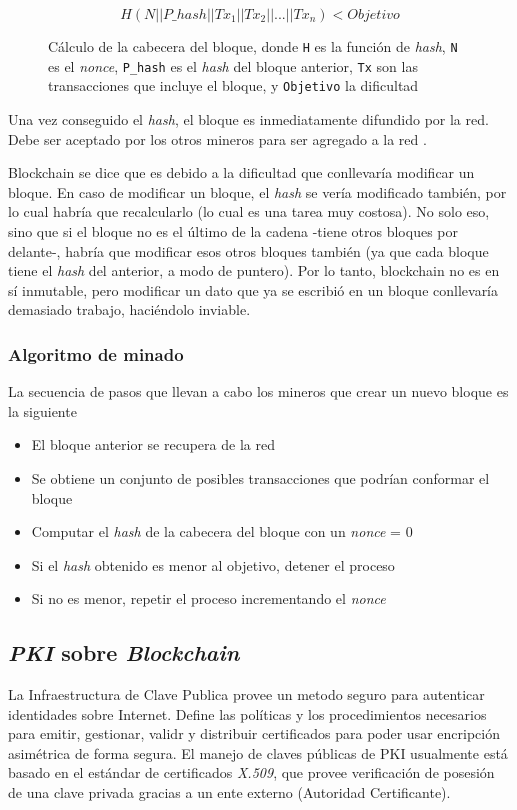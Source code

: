\begin{figure}[H]
    \centering
    \[ H(N || P\_hash|| Tx_1 || Tx_2 || ... || Tx_n) < Objetivo \]
    \caption*{Cálculo de la cabecera del bloque, donde \texttt{H} es la función de \emph{hash}, \texttt{N} es el \emph{nonce}, \texttt{P\_hash} es el \emph{hash} del bloque anterior, \texttt{Tx} son las transacciones que incluye el bloque, y \texttt{Objetivo} la dificultad}
\end{figure}

Una vez conseguido el \emph{hash}, el bloque es inmediatamente difundido por la red. Debe ser aceptado por los otros mineros para ser agregado a la red \autocite{MasteringBlockchainProofOfWork}. 

Blockchain se dice que es  debido a la dificultad que conllevaría modificar un bloque. En caso de modificar un bloque, el \emph{hash} se vería modificado también, por lo cual habría que recalcularlo (lo cual es una tarea muy costosa). No solo eso, sino que si el bloque no es el último de la cadena -tiene otros bloques por delante-, habría que modificar esos otros bloques también (ya que cada bloque tiene el \emph{hash} del anterior, a modo de puntero). Por lo tanto, blockchain no es en sí inmutable, pero modificar un dato que ya se escribió en un bloque conllevaría demasiado trabajo, haciéndolo inviable.

\subsubsection*{Algoritmo de minado}

La secuencia de pasos que llevan a cabo los mineros que crear un nuevo bloque es la siguiente \autocite{MasteringBlockchainMiningAlgorithm}

\begin{itemize}
    \item El bloque anterior se recupera de la red
    \item Se obtiene un conjunto de posibles transacciones que podrían conformar el bloque
    \item Computar el \emph{hash} de la cabecera del bloque con un \emph{nonce} = 0 
    \item Si el \emph{hash} obtenido es menor al objetivo, detener el proceso
    \item Si no es menor, repetir el proceso incrementando el \emph{nonce} 
\end{itemize}

\subsection{\emph{PKI} sobre \emph{Blockchain}}
La Infraestructura de Clave Publica provee un metodo seguro para autenticar identidades sobre Internet. Define las políticas y los procedimientos necesarios para emitir, gestionar, validr y distribuir certificados para poder usar encripción asimétrica de forma segura. El manejo de claves públicas de PKI usualmente está basado en el estándar de certificados \emph{X.509}, que provee verificación de posesión de una clave privada gracias a un ente externo (Autoridad Certificante).

